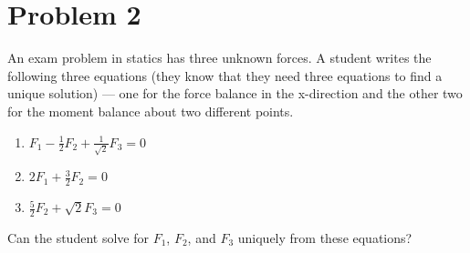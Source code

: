\section*{Problem 2}

An exam problem in statics has three unknown forces.
A student writes the following three equations (they know that they need three equations to find a unique solution) --- one for the force balance in the x-direction and the other two for the moment balance about two different points.

\begin{enumerate}
    \item \( F_1 - \frac{1}{2} F_2 + \frac{1}{\sqrt{2}} F_3 = 0 \)
    \item \( 2 F_1 + \frac{3}{2} F_2 = 0 \)
    \item \( \frac{5}{2} F_2 + \sqrt{2} F_3 = 0 \)
\end{enumerate}

Can the student solve for \( F_1 \), \( F_2 \), and \( F_3 \) uniquely from these equations?
